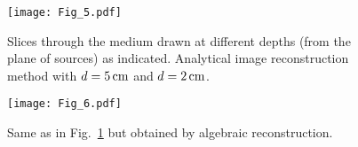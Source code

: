 \begin{figure}[htbp]
\begin{center}
\begin{minipage}[h]{1\textwidth}
\begin{center}
\texttt{[image: Fig\_5.pdf]}
\end{center}
\end{minipage}
\end{center}
\caption{\label{fig:slices_analytical}
Slices through the medium drawn at different depths (from the plane of sources) as indicated. Analytical image reconstruction method with $d=5\,{\rm cm}$ and $d=2\,{\rm cm}$.}
\end{figure}

\begin{figure}[htbp]
\begin{center}
\begin{minipage}[h]{1\textwidth}
\begin{center}
\texttt{[image: Fig\_6.pdf]}
\end{center}
\end{minipage}
\end{center}
\caption{\label{fig:slices_numerical}
  Same as in Fig.~\ref{fig:slices_analytical} but obtained by algebraic reconstruction. }
\end{figure}
